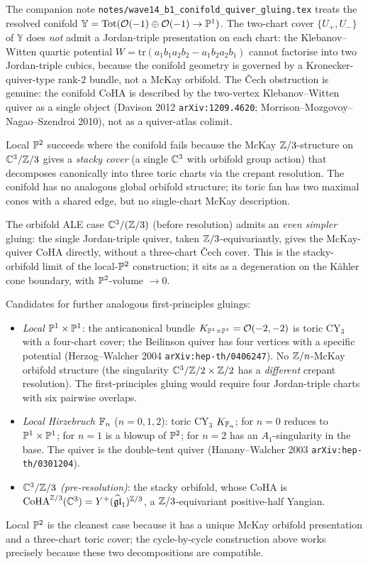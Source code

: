 \begin{remark}
\label{rmk:local-P2-vs-conifold}
The companion note \texttt{notes/wave14\_b1\_conifold\_quiver\_gluing.tex}
treats the resolved conifold
$\mathbb{Y}=\mathrm{Tot}(\mathcal{O}(-1)\oplus\mathcal{O}(-1)\to\mathbb{P}^1)$. The two-chart
cover $\{U_+,U_-\}$ of $\mathbb{Y}$ does \emph{not} admit a Jordan-triple
presentation on each chart: the Klebanov--Witten quartic potential
$W=\mathrm{tr}(a_1b_1a_2b_2-a_1b_2a_2b_1)$ cannot factorise into two
Jordan-triple cubics, because the conifold geometry is governed by a
Kronecker-quiver-type rank-$2$ bundle, not a McKay orbifold. The
\v Cech obstruction is genuine: the conifold CoHA is described by the
two-vertex Klebanov--Witten quiver as a single object (Davison 2012
\texttt{arXiv:1209.4620}; Morrison--Mozgovoy--Nagao--Szendroi 2010),
not as a quiver-atlas colimit.

Local $\mathbb{P}^2$ succeeds where the conifold fails because the McKay
$\mathbb{Z}/3$-structure on $\mathbb{C}^3/\mathbb{Z}/3$ gives a \emph{stacky cover} (a
single $\mathbb{C}^3$ with orbifold group action) that decomposes canonically
into three toric charts via the crepant resolution. The conifold has no
analogous global orbifold structure; its toric fan has two maximal
cones with a shared edge, but no single-chart McKay description.

The orbifold ALE case $\mathbb{C}^3/(\mathbb{Z}/3)$ (before resolution) admits an
\emph{even simpler} gluing: the single Jordan-triple quiver, taken
$\mathbb{Z}/3$-equivariantly, gives the McKay-quiver CoHA directly, without a
three-chart \v Cech cover. This is the stacky-orbifold limit of the
local-$\mathbb{P}^2$ construction; it sits as a degeneration on the K\"ahler
cone boundary, with $\mathbb{P}^2$-volume $\to 0$.

Candidates for further analogous first-principles gluings:
\begin{itemize}
\item \emph{Local $\mathbb{P}^1\times\mathbb{P}^1$}: the anticanonical bundle
$K_{\mathbb{P}^1\times\mathbb{P}^1}=\mathcal{O}(-2,-2)$ is toric CY$_3$ with a four-chart
cover; the Beilinson quiver has four vertices with a specific
potential (Herzog--Walcher 2004 \texttt{arXiv:hep-th/0406247}).
No $\mathbb{Z}/n$-McKay orbifold structure (the singularity
$\mathbb{C}^3/\mathbb{Z}/2\times\mathbb{Z}/2$ has a \emph{different} crepant resolution).
The first-principles gluing would require four Jordan-triple charts
with six pairwise overlaps.
\item \emph{Local Hirzebruch $\mathbb{F}_n$} ($n=0,1,2$): toric CY$_3$
$K_{\mathbb{F}_n}$; for $n=0$ reduces to $\mathbb{P}^1\times\mathbb{P}^1$; for $n=1$ is a
blowup of $\mathbb{P}^2$; for $n=2$ has an $A_1$-singularity in the base.
The quiver is the double-tent quiver (Hanany--Walcher 2003
\texttt{arXiv:hep-th/0301204}).
\item \emph{$\mathbb{C}^3/\mathbb{Z}/3$ (pre-resolution)}: the stacky orbifold, whose
CoHA is $\mathrm{CoHA}^{\mathbb{Z}/3}(\mathbb{C}^3)=Y^+(\widehat{\mathfrak{gl}}_1)^{\mathbb{Z}/3}$, a $\mathbb{Z}/3$-equivariant
positive-half Yangian.
\end{itemize}
Local $\mathbb{P}^2$ is the cleanest case because it has a unique McKay
orbifold presentation and a three-chart toric cover; the cycle-by-cycle
construction above works precisely because these two decompositions are
compatible.
\end{remark}

